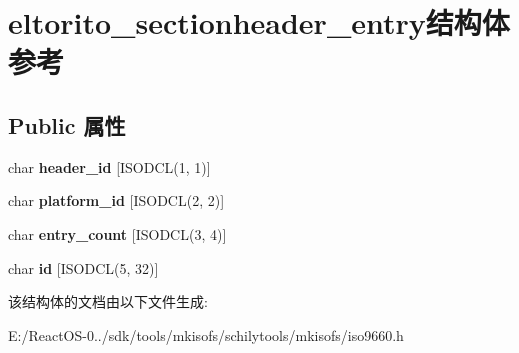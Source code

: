 \hypertarget{structeltorito__sectionheader__entry}{}\section{eltorito\+\_\+sectionheader\+\_\+entry结构体 参考}
\label{structeltorito__sectionheader__entry}
\subsection*{Public 属性}
\begin{DoxyCompactItemize}
\item 
\mbox{\label{structeltorito__sectionheader__entry_a9435aeee0f1bf9db4a9ce8647d92257d}} 
char {\bfseries header\+\_\+id} \mbox{[}I\+S\+O\+D\+CL(1, 1)\mbox{]}
\item 
\mbox{\label{structeltorito__sectionheader__entry_a9f9814d3768dcce3f9a4692de61417a3}} 
char {\bfseries platform\+\_\+id} \mbox{[}I\+S\+O\+D\+CL(2, 2)\mbox{]}
\item 
\mbox{\label{structeltorito__sectionheader__entry_a8ac7d5f831d7d2b0abcd19a60a667edc}} 
char {\bfseries entry\+\_\+count} \mbox{[}I\+S\+O\+D\+CL(3, 4)\mbox{]}
\item 
\mbox{\label{structeltorito__sectionheader__entry_a38bc74076e1316be772399be5dddde73}} 
char {\bfseries id} \mbox{[}I\+S\+O\+D\+CL(5, 32)\mbox{]}
\end{DoxyCompactItemize}


该结构体的文档由以下文件生成\+:\begin{DoxyCompactItemize}
\item 
E\+:/\+React\+O\+S-\/0../sdk/tools/mkisofs/schilytools/mkisofs/iso9660.\+h\end{DoxyCompactItemize}
